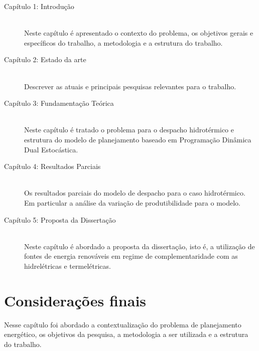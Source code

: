 \begin{description}
	\item[Cap\'itulo 1: Introdu\c c\~ao] \hfill \\
		Neste cap\'itulo \'e apresentado o contexto do problema, os objetivos gerais e espec\'ificos do trabalho, a
		metodologia e a estrutura do trabalho.
	\item[Cap\'itulo 2: Estado da arte] \hfill \\
		Descrever as atuais e principais pesquisas relevantes para o trabalho.
	\item[Cap\'itulo 3: Fundamenta\c c\~ao Te\'orica] \hfill \\
		Neste cap\'itulo \'e tratado o problema para o despacho hidrot\'ermico e estrutura do modelo de planejamento
		baseado em Programa\c c\~ao Din\^amica Dual Estoc\'astica.
	\item[Cap\'itulo 4: Resultados Parciais] \hfill \\
		Os resultados parciais do modelo de despacho para o caso hidrot\'ermico. Em particular a an\'alise da varia\c
		c\~ao de produtibilidade para o modelo.
	\item[Cap\'itulo 5: Proposta da Disserta\c c\~ao] \hfill \\
		Neste cap\'itulo \'e abordado a proposta da disserta\c c\~ao, isto \'e,  a utiliza\c c\~ao de fontes de energia
		renov\'aveis em regime de complementaridade com as hidrel\'etricas e termel\'etricas.
\end{description}
\section{Considera\c c\~oes finais}
Nesse cap\'itulo foi abordado a contextualiza\c c\~ao do problema de planejamento energ\'etico, os objetivos da
pesquisa, a metodologia a ser utilizada e a estrutura do trabalho.

